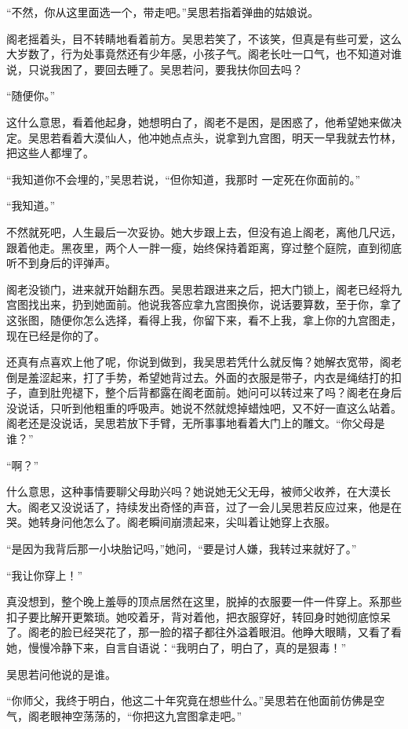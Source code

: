 “不然，你从这里面选一个，带走吧。”吴思若指着弹曲的姑娘说。

阁老摇着头，目不转睛地看着前方。吴思若笑了，不该笑，但真是有些可爱，这么大岁数了，行为处事竟然还有少年感，小孩子气。阁老长吐一口气，也不知道对谁说，只说我困了，要回去睡了。吴思若问，要我扶你回去吗？

“随便你。”

这什么意思，看着他起身，她想明白了，阁老不是困，是困惑了，他希望她来做决定。吴思若看着大漠仙人，他冲她点点头，说拿到九宫图，明天一早我就去竹林，把这些人都埋了。

“我知道你不会埋的，”吴思若说，“但你知道，我那时
一定死在你面前的。”

“我知道。”

不然就死吧，人生最后一次妥协。她大步跟上去，但没有追上阁老，离他几尺远，跟着他走。黑夜里，两个人一胖一瘦，始终保持着距离，穿过整个庭院，直到彻底听不到身后的评弹声。

阁老没锁门，进来就开始翻东西。吴思若跟进来之后，把大门锁上，阁老已经将九宫图找出来，扔到她面前。他说我答应拿九宫图换你，说话要算数，至于你，拿了这张图，随便你怎么选择，看得上我，你留下来，看不上我，拿上你的九宫图走，现在已经是你的了。

还真有点喜欢上他了呢，你说到做到，我吴思若凭什么就反悔？她解衣宽带，阁老倒是羞涩起来，打了手势，希望她背过去。外面的衣服是带子，内衣是绳结打的扣子，直到肚兜褪下，整个后背都露在阁老面前。她问可以转过来了吗？阁老在身后没说话，只听到他粗重的呼吸声。她说不然就熄掉蜡烛吧，又不好一直这么站着。阁老还是没说话，吴思若放下手臂，无所事事地看着大门上的雕文。“你父母是谁？”

“啊？”

什么意思，这种事情要聊父母助兴吗？她说她无父无母，被师父收养，在大漠长大。阁老又没说话了，持续发出奇怪的声音，过了一会儿吴思若反应过来，他是在哭。她转身问他怎么了。阁老瞬间崩溃起来，尖叫着让她穿上衣服。

“是因为我背后那一小块胎记吗，”她问，“要是讨人嫌，我转过来就好了。”

“我让你穿上！”

真没想到，整个晚上羞辱的顶点居然在这里，脱掉的衣服要一件一件穿上。系那些扣子要比解开更繁琐。她咬着牙，背对着他，把衣服穿好，转回身时她彻底惊呆了。阁老的脸已经哭花了，那一脸的褶子都往外溢着眼泪。他睁大眼睛，又看了看她，慢慢冷静下来，自言自语说：“我明白了，明白了，真的是狠毒！”

吴思若问他说的是谁。

“你师父，我终于明白，他这二十年究竟在想些什么。”吴思若在他面前仿佛是空气，阁老眼神空荡荡的，“你把这九宫图拿走吧。”

